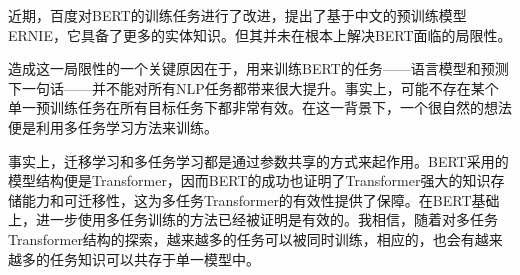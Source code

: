 近期，百度对BERT的训练任务进行了改进，提出了基于中文的预训练模型ERNIE，它具备了更多的实体知识。但其并未在根本上解决BERT面临的局限性。

造成这一局限性的一个关键原因在于，用来训练BERT的任务——语言模型和预测下一句话——并不能对所有NLP任务都带来很大提升。事实上，可能不存在某个单一预训练任务在所有目标任务下都非常有效。在这一背景下，一个很自然的想法便是利用多任务学习方法来训练。

事实上，迁移学习和多任务学习都是通过参数共享的方式来起作用。BERT采用的模型结构便是Transformer，因而BERT的成功也证明了Transformer强大的知识存储能力和可迁移性，这为多任务Transformer的有效性提供了保障。在BERT基础上，进一步使用多任务训练的方法已经被证明是有效的\cite{liu2019multi}。我相信，随着对多任务Transformer结构的探索，越来越多的任务可以被同时训练，相应的，也会有越来越多的任务知识可以共存于单一模型中。

